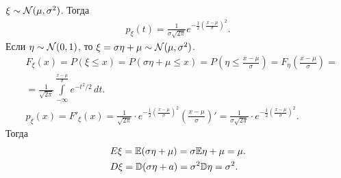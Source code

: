 \documentclass[../main.tex]{subfiles}
\begin{document}
   \begin{exmpl}
    $ \xi \sim \mathcal N(\mu,\sigma^{2}) $. Тогда
    \begin{align*}
     p_\xi(t) = \frac{1}{\sigma\sqrt{2\pi}} e^{-\frac{1}{2} \left( \frac{x-\mu}{\sigma} \right)^{2}}.
    \end{align*} Если $ \eta \sim \mathcal N(0,1) $, то $ \xi = \sigma \eta + \mu \sim \mathcal N(\mu,\sigma^{2}) $.
    \begin{align*}
     &F_\xi(x) = P(\xi \leqslant x) = P(\sigma\eta + \mu \leqslant x) = P\left(\eta \leqslant \frac{x-\mu}{\sigma}\right) = F_{\eta}\left( \frac{x-\mu}{\sigma} \right) = \\
     &= \frac{1}{\sqrt{2\pi}} \int\limits_{-\infty}^{\frac{x-\mu}{\sigma}} e^{-t^{2} / 2}\,dt. \\
     &p_\xi(x) = F'_\xi(x) = \frac{1}{\sqrt{2\pi}} \cdot e^{-\frac{1}{2} \left( \frac{x-\mu}{\sigma} \right)^{2}} \left( \frac{x-\mu}{\sigma} \right)' = \frac{1}{\sigma\sqrt{2\pi}} \cdot e^{-\frac{1}{2} \left( \frac{x-\mu}{\sigma} \right)^{2}}.
    \end{align*} Тогда
    \begin{align*}
     &E\xi = \mathbb E(\sigma \eta + \mu)  = \sigma \mathbb E\eta + \mu = \mu.\\
     &D\xi = \mathbb D(\sigma\eta + a) = \sigma^{2}\mathbb D\eta = \sigma^{2}.
    \end{align*} 
   \end{exmpl}
\end{document}
